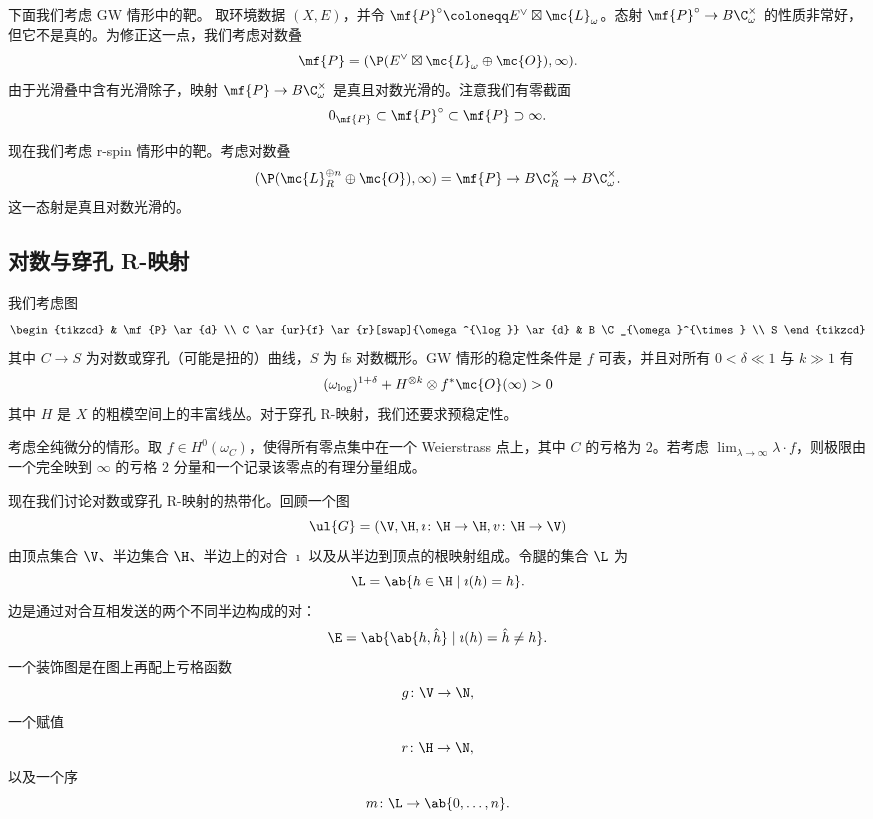 下面我们考虑 GW 情形中的靶。
取环境数据 \((X, E)\)，并令 \(\mf{P}^{\circ} \coloneqq E^{\vee} \boxtimes \mc{L}_{\omega}\)。态射 \(\mf{P}^{\circ} \to B \C_{\omega}^{\times}\) 的性质非常好，但它不是真的。为修正这一点，我们考虑对数叠
\[ \mf{P} = ( \P(E^{\vee} \boxtimes \mc{L}_{\omega} \oplus \mc{O}) , \infty). \]
由于光滑叠中含有光滑除子，映射 \(\mf{P} \to B \C_{\omega}^{\times}\) 是真且对数光滑的。注意我们有零截面
\[ 0_{\mf{P}} \subset \mf{P}^{\circ} \subset \mf{P} \supset \infty. \]

现在我们考虑 r-spin 情形中的靶。考虑对数叠
\[ (\P(\mc{L}_R^{\oplus n} \oplus \mc{O}), \infty) = \mf{P} \to B \C_R^{\times} \to B \C_{\omega}^{\times}. \]
这一态射是真且对数光滑的。

\subsection{对数与穿孔 R-映射}%
\label{sub:Log and punctured R-maps}

我们考虑图
\begin{equation*}
\begin{tikzcd}
    & \mf{P} \ar{d} \\
    C \ar{ur}{f} \ar{r}[swap]{\omega^{\log}} \ar{d} & B \C_{\omega}^{\times} \\
    S
\end{tikzcd}
\end{equation*}
其中 \(C \to S\) 为对数或穿孔（可能是扭的）曲线，\(S\) 为 fs 对数概形。GW 情形的稳定性条件是 \(f\) 可表，并且对所有 \(0 < \delta \ll 1\) 与 \(k \gg 1\) 有
\[ (\omega_{\log})^{1+\delta} + H^{\otimes k} \otimes f^* \mc{O}(\infty) > 0 \]
其中 \(H\) 是 \(X\) 的粗模空间上的丰富线丛。对于穿孔 R-映射，我们还要求预稳定性。

\begin{exm}
    考虑全纯微分的情形。取 \(f \in H^0(\omega_C)\)，使得所有零点集中在一个 Weierstrass 点上，其中 \(C\) 的亏格为 \(2\)。若考虑 \(\lim_{\lambda \to \infty} \lambda \cdot f\)，则极限由一个完全映到 \(\infty\) 的亏格 \(2\) 分量和一个记录该零点的有理分量组成。
\end{exm}

现在我们讨论对数或穿孔 R-映射的热带化。回顾一个图
\[ \ul{G} = (\V, \H, \imath \colon \H \to \H, v \colon \H \to \V) \]
由顶点集合 \(\V\)、半边集合 \(\H\)、半边上的对合 \(\imath\) 以及从半边到顶点的根映射组成。令腿的集合 \(\L\) 为
\[ \L = \ab\{ h \in \H \mid \imath(h) = h\}. \]
边是通过对合互相发送的两个不同半边构成的对：
\[ \E = \ab\{ \ab\{h, \hat{h}\} \mid \imath(h) = \hat{h} \neq h \}. \]
一个装饰图是在图上再配上亏格函数
\[ g \colon \V \to \N, \]
一个赋值
\[ r \colon \H \to \N, \]
以及一个序
\[ m \colon \L \to \ab\{0, \ldots, n\}. \]

